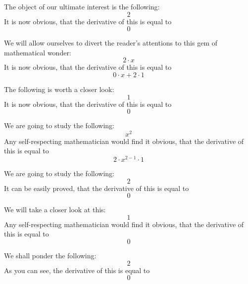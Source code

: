 \documentclass{article}
\begin{document}
The object of our ultimate interest is the following:
\begin{equation}
2 
\end{equation}
It is now obvious, that the derivative of this is equal to
\begin{equation}
0 
\end{equation}

We will allow ourselves to divert the reader's attentions to this gem of mathematical wonder:
\begin{equation}
2 \cdot x 
\end{equation}
It is now obvious, that the derivative of this is equal to
\begin{equation}
0 \cdot x + 2 \cdot 1 
\end{equation}

The following is worth a closer look:
\begin{equation}
1 
\end{equation}
It is now obvious, that the derivative of this is equal to
\begin{equation}
0 
\end{equation}

We are going to study the following:
\begin{equation}
x ^{2 } 
\end{equation}
Any self-respecting mathematician would find it obvious, that the derivative of this is equal to
\begin{equation}
2 \cdot x ^{2 - 1 } \cdot 1 
\end{equation}

We are going to study the following:
\begin{equation}
2 
\end{equation}
It can be easily proved, that the derivative of this is equal to
\begin{equation}
0 
\end{equation}

We will take a closer look at this:
\begin{equation}
1 
\end{equation}
Any self-respecting mathematician would find it obvious, that the derivative of this is equal to
\begin{equation}
0 
\end{equation}

We shall ponder the following:
\begin{equation}
2 
\end{equation}
As you can see, the derivative of this is equal to
\begin{equation}
0 
\end{equation}
\end{document}
